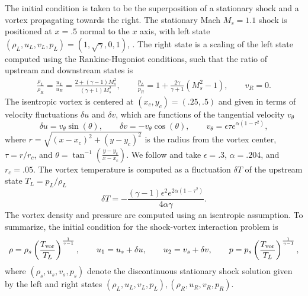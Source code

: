 \documentclass[review,onefignum,onetabnum,final]{siamart171218}
\newcommand{\LRp}[1]{\left( #1 \right)}
\newcommand{\note}[1]{{\color{blue}{#1}}}
\begin{document}
The initial condition is taken to be the superposition of a stationary shock and a vortex propagating towards the right.  The stationary Mach $M_s = 1.1$ shock is positioned at $x = .5$ normal to the $x$ axis, with left state $\LRp{\rho_L, u_L, v_L, p_L} = \LRp{1, \sqrt{\gamma}, 0, 1}$, \note{where $u_L, v_L$ denote $x,y$ components of the left-state velocity}.  The right state is a scaling of the left state computed using the Rankine-Hugoniot conditions, such that the ratio of upstream and downstream states is
\begin{align*}
\frac{\rho_L}{\rho_R} = \frac{u_L}{u_R} = \frac{2+ (\gamma-1) M_s^2}{(\gamma+1)M_s^2}, \qquad \frac{p_L}{p_R} = 1+ \frac{2\gamma}{\gamma+1}\LRp{M_s^2-1}, \qquad v_R = 0.
\end{align*}
The isentropic vortex is centered at $(x_c,y_c) = (.25, .5)$ and given in terms of velocity fluctuations $\delta u$ and $\delta v$, which are functions of the tangential velocity $v_{\theta}$
\[
\delta u = v_{\theta} \sin(\theta), \qquad
\delta v = -v_{\theta} \cos(\theta), \qquad
v_{\theta} = \epsilon \tau e^{\alpha(1-\tau^2)},
\]
where $r = \sqrt{(x-x_c)^2 + (y-y_c)^2}$ is the radius from the vortex center, $\tau = r/r_c$, and $\theta = \tan^{-1}\LRp{\frac{y-y_c}{x-x_c}}$.  We follow \cite{shu1998essentially} and take $\epsilon = .3$, $\alpha = .204$, and $r_c = .05$.  The vortex temperature is computed as a fluctuation $\delta T$ of the upstream state $T_L = p_L/\rho_L$
\[
\delta T =  - \frac{(\gamma-1)\epsilon^2 e^{2\alpha (1-\tau^2)}}{4\alpha\gamma}.  
\]
The vortex density and pressure are computed using an isentropic assumption.  To summarize, the initial condition for the shock-vortex interaction problem is 
\begin{gather*}
\rho = \rho_s \LRp{\frac{T_{\rm vor}}{T_L}}^{\frac{1}{\gamma-1}}, \qquad u_1 = u_s + \delta u, \qquad u_2 = v_s + \delta v, \qquad p = p_s \LRp{\frac{T_{\rm vor}}{T_L}}^{\frac{1}{\gamma-1}},
\end{gather*}
where $(\rho_s,  u_s, v_s, p_s)$ denote the discontinuous stationary shock solution given by the left and right states $\LRp{\rho_L, u_L, v_L, p_L}, \LRp{\rho_R, u_R, v_R, p_R}$.  
\end{document}
